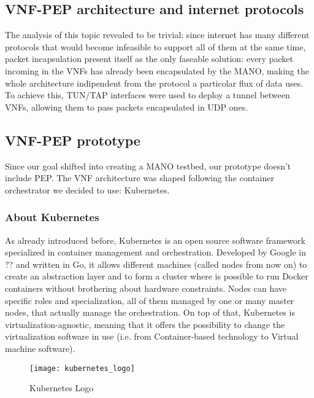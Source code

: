 \subsection{VNF-PEP architecture and internet protocols}

The analysis of this topic revealed to be trivial: since internet has many
different protocols that would become infeasible to support all of them at the
same time, packet incapsulation present itself as the only faseable solution:
every packet incoming in the VNFs has already been encapsulated by the MANO,
 making the whole architecture indipendent from the
protocol a particolar flux of data uses. To achieve this, TUN/TAP interfaces 
were used to deploy a tunnel between VNFs, allowing them to pass packets 
encapsulated in UDP ones.

\subsection{VNF-PEP prototype}

Since our goal shifted into creating a MANO testbed, our prototype doesn't
include PEP. The VNF architecture was shaped following the container
orchestrator we decided to use: Kubernetes.

\subsubsection{About Kubernetes}

As already introduced before, Kubernetes is an open source software framework
specialized in container management and orchestration. Developed by Google in
?? and written in Go, it allows different
machines (called nodes from now on) to create an abstraction layer and to form a
cluster where is possible to run Docker containers without brothering about
hardware constraints. Nodes can have specific roles and specialization, all of
them managed by one or many master nodes, that actually manage the
orchestration. On top of that, Kubernetes is virtualization-agnostic, meaning
that it offers the possibility to change the virtualization software in use
(i.e. from Container-based technology to Virtual machine software).
\begin{figure}[h]
 \centering \texttt{[image: kubernetes\_logo]}
 \caption{Kubernetes Logo}
 \label{chap:intro:img:k8s_logo}
\end{figure}


